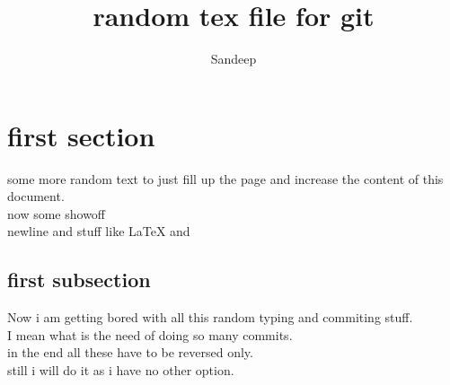 \documentclass {article}
\author {Sandeep}
\title {random tex file for git}
\begin{document}
\maketitle
\section{first section}
some more random text to just fill up the page and increase the content of this document.\\
now some showoff\cite{sandu} \\
newline and stuff like \LaTeX{} and \cite{sandbook}

\subsection{first subsection}
Now i am getting bored with all this random typing and commiting stuff.\\
I mean what is the need of doing so many commits.\\
in the end all these have to be reversed only.\\
still i will do it as i have no other option.



\end{document}
